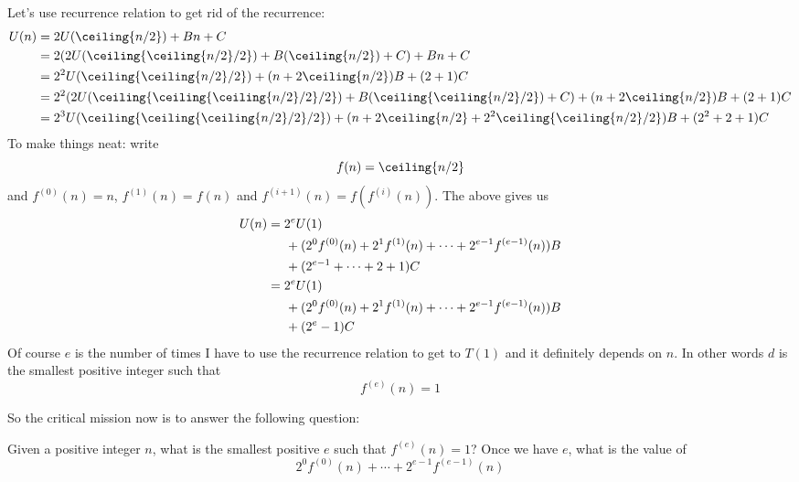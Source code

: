 Let's use recurrence relation to get rid of the recurrence:
\begin{align*}
U(n) 
&= 2U(\ceiling{n/2}) + Bn + C \\
&= 2(
     2U(
        \ceiling{ 
         \ceiling{n/2} / 2 
       }
      ) 
     + B(\ceiling{n/2}) + C
    ) 
   + Bn + C \\
&= 2^2 U(
         \ceiling{ 
          \ceiling{n
          /2} 
         /2}
       ) 
     + (n + 2\ceiling{n/2})B + (2 + 1)C
    \\
&= 2^2
   (2U(
        \ceiling{
         \ceiling{ 
          \ceiling{n
          /2} 
         /2}
        /2}
      )
    + B(        
        \ceiling{ 
         \ceiling{n
         /2} 
        /2}
      )
    + C
   ) 
     + (n + 2\ceiling{n/2})B + (2 + 1)C
    \\
&= 2^3
   U(
        \ceiling{
         \ceiling{ 
          \ceiling{n
          /2} 
         /2}
        /2}
      )
    +         
       (n 
        + 2\ceiling{n/2}
        +
        2^2
        \ceiling{ 
         \ceiling{n
         /2} 
        /2}
       )B 
     + (2^2 + 2 + 1)C
\end{align*}
To make things neat: write
\[
f(n) = \ceiling{n/2}
\]
and $f^{(0)}(n) = n$,
$f^{(1)}(n) = f(n)$ and $f^{(i+1)}(n) = f(f^{(i)}(n))$. 
The above gives us
\begin{align*}
U(n) 
&= 2^e U(1) \\
&\hspace{0.5cm} + (2^0f^{(0)}(n) + 2^1f^{(1)}(n) + \cdots + 2^{e-1}f^{(e-1)}(n))B \\
&\hspace{0.5cm} + (2^{e-1} + \cdots + 2 + 1)C \\
&= 2^e U(1) \\
&\hspace{0.5cm} + (2^0f^{(0)}(n) + 2^1f^{(1)}(n) + \cdots + 2^{e-1}f^{(e-1)}(n))B \\
&\hspace{0.5cm} + (2^e - 1)C
\end{align*}
Of course $e$ is the number of times I have to use the recurrence relation
to get to $T(1)$ and it definitely depends on $n$.
In other words $d$ is the smallest positive integer such that
\[
f^{(e)}(n) = 1
\]

So the critical mission now is to answer the following question:
\begin{itemize}
\li Given a positive integer $n$, 
what is the smallest positive $e$ such that $f^{(e)}(n) = 1$?
\li Once we have $e$, what is the value of 
\[
2^0f^{(0)}(n) + \cdots + 2^{e-1}f^{(e-1)}(n)  
\]
\end{itemize}

